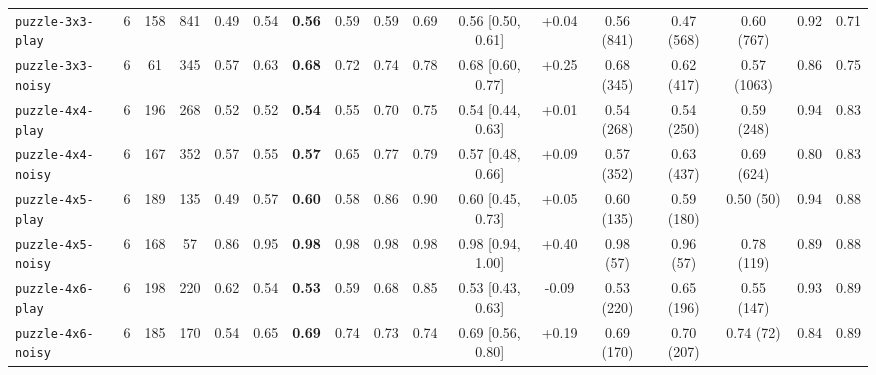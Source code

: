 \begin{tabular}{lccc|cccccc|cc|ccc|cc}
\texttt{puzzle-3x3-play} & 6 & 158 & 841 & 0.49 & 0.54 & \textbf{0.56} & 0.59 & 0.59 & 0.69 & 0.56 [0.50, 0.61] & +0.04 & 0.56 (841) & 0.47 (568) & 0.60 (767) & 0.92 & 0.71 \\
\texttt{puzzle-3x3-noisy} & 6 & 61 & 345 & 0.57 & 0.63 & \textbf{0.68} & 0.72 & 0.74 & 0.78 & 0.68 [0.60, 0.77] & +0.25 & 0.68 (345) & 0.62 (417) & 0.57 (1063) & 0.86 & 0.75 \\
\texttt{puzzle-4x4-play} & 6 & 196 & 268 & 0.52 & 0.52 & \textbf{0.54} & 0.55 & 0.70 & 0.75 & 0.54 [0.44, 0.63] & +0.01 & 0.54 (268) & 0.54 (250) & 0.59 (248) & 0.94 & 0.83 \\
\texttt{puzzle-4x4-noisy} & 6 & 167 & 352 & 0.57 & 0.55 & \textbf{0.57} & 0.65 & 0.77 & 0.79 & 0.57 [0.48, 0.66] & +0.09 & 0.57 (352) & 0.63 (437) & 0.69 (624) & 0.80 & 0.83 \\
\texttt{puzzle-4x5-play} & 6 & 189 & 135 & 0.49 & 0.57 & \textbf{0.60} & 0.58 & 0.86 & 0.90 & 0.60 [0.45, 0.73] & +0.05 & 0.60 (135) & 0.59 (180) & 0.50 (50) & 0.94 & 0.88 \\
\texttt{puzzle-4x5-noisy} & 6 & 168 & 57 & 0.86 & 0.95 & \textbf{0.98} & 0.98 & 0.98 & 0.98 & 0.98 [0.94, 1.00] & +0.40 & 0.98 (57) & 0.96 (57) & 0.78 (119) & 0.89 & 0.88 \\
\texttt{puzzle-4x6-play} & 6 & 198 & 220 & 0.62 & 0.54 & \textbf{0.53} & 0.59 & 0.68 & 0.85 & 0.53 [0.43, 0.63] & -0.09 & 0.53 (220) & 0.65 (196) & 0.55 (147) & 0.93 & 0.89 \\
\texttt{puzzle-4x6-noisy} & 6 & 185 & 170 & 0.54 & 0.65 & \textbf{0.69} & 0.74 & 0.73 & 0.74 & 0.69 [0.56, 0.80] & +0.19 & 0.69 (170) & 0.70 (207) & 0.74 (72) & 0.84 & 0.89 \\
\bottomrule
\end{tabular}
